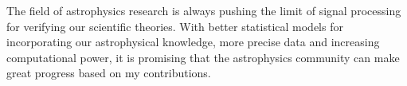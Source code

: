 The field of astrophysics research is always pushing the limit of signal
processing for verifying our scientific theories.
With better statistical models for incorporating our astrophysical knowledge, 
more precise data and increasing computational power, it is promising that the
astrophysics community can make great progress based on my contributions.   



% 
% 

% 
% 
